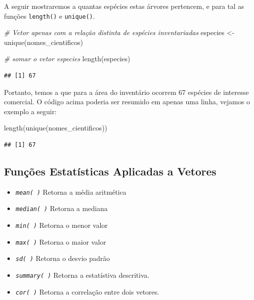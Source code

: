 \documentclass[
]{article}
\newenvironment{Shaded}{\begin{snugshade}}{\end{snugshade}}
\newcommand{\CommentTok}[1]{\textcolor[rgb]{0.56,0.35,0.01}{\textit{#1}}}
\newcommand{\FunctionTok}[1]{\textcolor[rgb]{0.00,0.00,0.00}{#1}}
\newcommand{\NormalTok}[1]{#1}
\newcommand{\OtherTok}[1]{\textcolor[rgb]{0.56,0.35,0.01}{#1}}
\begin{document}
A seguir mostraremos a quantas espécies estas árvores pertencem, e para
tal as funções \texttt{length()} e \texttt{unique()}.

\begin{Shaded}
\begin{Highlighting}[]
\CommentTok{\# Vetor apenas com a relação distinta de espécies inventariadas}
\NormalTok{especies }\OtherTok{\textless{}{-}} \FunctionTok{unique}\NormalTok{(nomes\_cientificos)}

\CommentTok{\# somar o vetor especies}
\FunctionTok{length}\NormalTok{(especies)}
\end{Highlighting}
\end{Shaded}

\begin{verbatim}
## [1] 67
\end{verbatim}

Portanto, temos a que para a área do inventário ocorrem 67 espécies de
interesse comercial. O código acima poderia ser resumido em apenas uma
linha, vejamos o exemplo a seguir:

\begin{Shaded}
\begin{Highlighting}[]
\FunctionTok{length}\NormalTok{(}\FunctionTok{unique}\NormalTok{(nomes\_cientificos))}
\end{Highlighting}
\end{Shaded}

\begin{verbatim}
## [1] 67
\end{verbatim}

\hypertarget{funuxe7uxf5es-estatuxedsticas-aplicadas-a-vetores}{%
\subsection{Funções Estatísticas Aplicadas a
Vetores}\label{funuxe7uxf5es-estatuxedsticas-aplicadas-a-vetores}}

\begin{itemize}
\item
  \emph{\texttt{mean(\ )}} Retorna a média aritmética
\item
  \emph{\texttt{median(\ )}} Retorna a mediana
\item
  \emph{\texttt{min(\ )}} Retorna o menor valor
\item
  \emph{\texttt{max(\ )}} Retorna o maior valor
\item
  \emph{\texttt{sd(\ )}} Retorna o desvio padrão
\item
  \emph{\texttt{summary(\ )}} Retorna a estatístiva descritiva.
\item
  \emph{\texttt{cor(\ )}} Retorna a correlação entre dois vetores.
\end{itemize}
\end{document}
